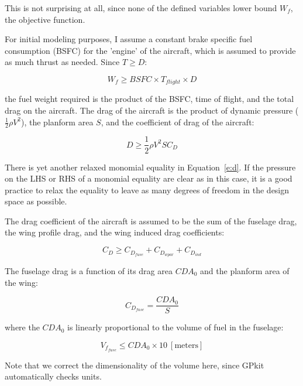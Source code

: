 This is not surprising at all, since none of the defined variables lower bound $W_f$,
the objective function.

For initial modeling purposes, I assume a constant brake
specific fuel consumption (BSFC) for the 'engine' of the aircraft, which is assumed
to provide as much thrust as needed. Since $T \geq D$:

\begin{equation}
    W_f \geq BSFC \times T_{flight} \times D
\end{equation}

the fuel weight required is the product of the BSFC, time of flight, and the total drag on the aircraft.
The drag of the aircraft is the product of dynamic pressure ($\frac{1}{2} \rho V^2$),
the planform area $S$, and the coefficient of drag of the aircraft:

\begin{equation} 
    D \geq \frac{1}{2} \rho V^2 S  C_D
\label{e:d}
\end{equation}

There is yet another relaxed monomial equality in Equation~\ref{e:d}.
If the pressure on the \gls{LHS} or \gls{RHS} of a monomial equality are clear as in this case,
it is a good practice to relax the equality to leave as many degrees of freedom
in the design space as possible.

The drag coefficient of the aircraft is assumed to be the sum of the fuselage drag,
the wing profile drag, and the wing induced drag coefficients:

\begin{equation}
    C_D \geq C_{D_{fuse}} + C_{D_{wpar}} + C_{D_{ind}}
\label{e:cd}
\end{equation}

The fuselage drag is a function of its drag area $CDA_0$ and the planform area of the wing:

\begin{equation}
    C_{D_{fuse}} = \frac{CDA_0}{S}
\label{e:cdfuse}
\end{equation}

where the $CDA_0$ is linearly proportional to the volume of fuel in the fuselage:

\begin{equation}
    V_{f_{fuse}} \leq CDA_0 \times 10 ~\mathrm{[meters]}
\label{e:vffuse}
\end{equation}

Note that we correct the dimensionality of the volume here, since GPkit automatically checks units. 


